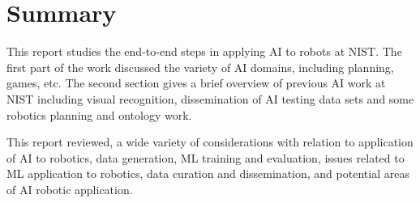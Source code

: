 \newpage
\section{Summary}


This report studies the end-to-end steps in applying AI to robots at NIST.  The first part of the work discussed the variety of AI domains, including planning, games, etc. The  second section gives a brief overview of previous AI work at NIST including visual recognition, dissemination of AI testing data sets and  some robotics planning and ontology work. 


This report reviewed, a wide variety of considerations with relation to application of AI to robotics, data generation, ML training and evaluation, issues related to ML application to robotics, data curation and dissemination, and potential areas of AI robotic application.




